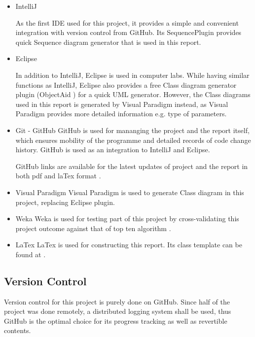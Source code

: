 \begin{itemize}
	\item{IntelliJ} \cite{intellij}
	
	As the first IDE used for this project, it provides a simple and convenient integration with version control from GitHub. Its SequencePlugin \cite{sequenceplugin} provides quick Sequence diagram generator that is used in this report. 
	
	\item{Eclipse} \cite{eclipse}
	
	In addition to IntelliJ, Eclipse is used in computer labs. While having similar functions as IntelliJ, Eclipse also provides a free Class diagram generator plugin (ObjectAid \cite{objectaid}) for a quick UML generator. However, the Class diagrams used in this report is generated by Visual Paradigm instead, as Visual Paradigm provides more detailed information e.g. type of parameters. 
		
	\item{Git - GitHub} \cite{github}
	GitHub is used for mananging the project and the report itself, which ensures mobility of the programme and detailed records of code change history. GitHub is used as an integration to IntelliJ and Eclipse.
	
	GitHub links are available for the latest updates of project \cite{githubproject} and the report in both pdf and laTex format \cite{githubreport}.
	
	\item{Visual Paradigm} \cite{visualparadigm}
	Visual Paradigm is used to generate Class diagram in this project, replacing Eclipse plugin.
		
	\item{Weka} \cite{Hall:2009:WDM:1656274.1656278}
	Weka is used for testing part of this project by cross-validating this project outcome against that of top ten algorithm \cite{Wu2008}. 
		
	\item{LaTex}
	LaTex is used for constructing this report. Its class template can be found at \cite{sphdtemplate}.

\end{itemize}

\subsection{Version Control}
	Version control for this project is purely done on GitHub. Since half of the project was done remotely, a distributed logging system shall be used, thus GitHub is the optimal choice for its progress tracking as well as revertible contents.
	





